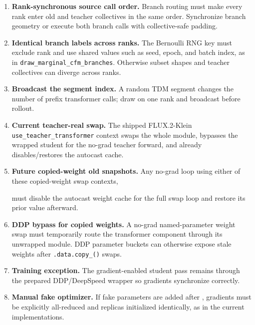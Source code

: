 \documentclass[11pt,a4paper]{article}
\theoremstyle{plain}
\theoremstyle{definition}
\begin{document}
\begin{enumerate}[leftmargin=1.6em]
\item \textbf{Rank-synchronous source call order.}  Branch routing must make every rank enter old
      and teacher collectives in the same order.  Synchronize branch geometry or execute both
      branch calls with collective-safe padding.
\item \textbf{Identical branch labels across ranks.}  The Bernoulli RNG key must exclude rank
      and use shared values such as seed, epoch, and batch index, as in
      \texttt{draw\_marginal\_cfm\_branches}.  Otherwise subset shapes and teacher collectives can
      diverge across ranks.
\item \textbf{Broadcast the segment index.}  A random TDM segment changes the number of prefix
      transformer calls; draw on one rank and broadcast before rollout.
\item \textbf{Current teacher-real swap.}  The shipped FLUX.2-Klein
      \texttt{use\_teacher\_transformer} context swaps the whole module, bypasses the wrapped
      student for the no-grad teacher forward, and already disables/restores the autocast cache.
\item \textbf{Future copied-weight old snapshots.}  Any no-grad loop using either of these
      copied-weight swap contexts,
      \par\smallskip
      \par
      \par\smallskip
      must disable the autocast weight cache for the full swap loop and restore its prior value
      afterward.
\item \textbf{DDP bypass for copied weights.}  A no-grad named-parameter weight swap must
      temporarily route the transformer component through its unwrapped module.  DDP parameter
      buckets can otherwise expose stale weights after \texttt{.data.copy\_()} swaps.
\item \textbf{Training exception.}  The gradient-enabled student pass remains through the prepared
      DDP/DeepSpeed wrapper so gradients synchronize correctly.
\item \textbf{Manual fake optimizer.}  If fake parameters are added after
      , gradients must be explicitly all-reduced and replicas
      initialized identically, as in the current implementations.
\end{enumerate}
\end{document}
